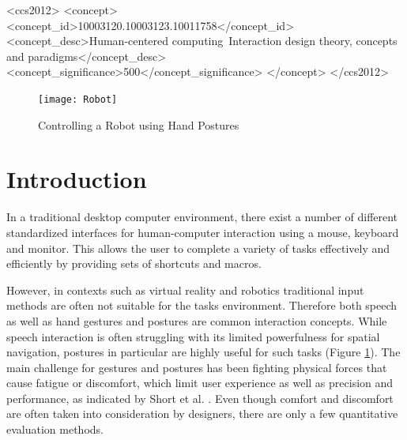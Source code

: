 \documentclass{sig-alternate-05-2015}
\begin{document}
%
%
\begin{CCSXML}
<ccs2012>
<concept>
<concept_id>10003120.10003123.10011758</concept_id>
<concept_desc>Human-centered computing~Interaction design theory, concepts and paradigms</concept_desc>
<concept_significance>500</concept_significance>
</concept>
</ccs2012>
\end{CCSXML}



\begin{figure}
\centering
\texttt{[image: Robot]}
\vspace{-20pt}
\caption{Controlling a Robot using Hand Postures}
\label{fig:Robot}
\vspace{-5pt}
\end{figure}

%
%

%
%
\printccsdesc



\section{Introduction}

In a traditional desktop computer environment, there exist a number of different standardized interfaces for human-computer interaction using a mouse, keyboard and monitor. This allows the user to 
complete a variety of tasks effectively and efficiently by providing sets of shortcuts and macros. 

However, in contexts such as virtual reality and robotics traditional input methods are often not suitable for the tasks environment. Therefore both speech as well as hand gestures and postures are common interaction concepts. While speech interaction is often struggling with its limited powerfulness for spatial navigation, postures in particular are highly useful for such tasks (Figure \ref{fig:Robot}). The main challenge for gestures and postures has been fighting physical forces that cause fatigue or discomfort, which limit user experience as well as precision and performance, as indicated by Short et al. \cite{short1999precision}. Even though comfort and discomfort are often taken into consideration by designers, there are only a few quantitative evaluation methods\cite{naddeo2015proposal}.
\end{document}
